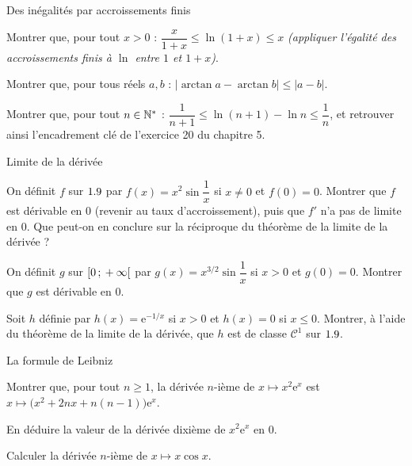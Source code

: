 \begin{exercice}[2]{Des inégalités par accroissements finis}
\begin{questions}
  \item Montrer que, pour tout $x>0$ :
    $\dfrac{x}{1+x}\leq\ln(1+x)\leq x$
    \emph{(appliquer l'égalité des accroissements finis à $\ln$ entre $1$
    et $1+x$)}.
  \item Montrer que, pour tous réels $a,b$ :
    $|\arctan a-\arctan b|\leq|a-b|$.
  \item Montrer que, pour tout $n\in\mathbb{N}^{*}$ :
    $\dfrac{1}{n+1}\leq\ln(n+1)-\ln n\leq\dfrac1n$, et retrouver ainsi
    l'encadrement clé de l'exercice 20 du chapitre 5.
\end{questions}
\end{exercice}

\begin{exercice}[2]{Limite de la dérivée}
\begin{questions}
  \item On définit $f$ sur $1.9$ par $f(x)=x^{2}\sin\dfrac1x$ si $x\neq0$ et
    $f(0)=0$. Montrer que $f$ est dérivable en $0$ (revenir au taux
    d'accroissement), puis que $f'$ n'a pas de limite en $0$. Que peut-on
    en conclure sur la réciproque du théorème de la limite de la dérivée ?
  \item On définit $g$ sur $\mathopen{[}0\,{;}\,+\infty\mathclose{[}$ par
    $g(x)=x^{3/2}\sin\dfrac1x$ si $x>0$ et $g(0)=0$. Montrer que $g$ est
    dérivable en $0$.
  \item Soit $h$ définie par $h(x)=\mathrm{e}^{-1/x}$ si $x>0$ et $h(x)=0$ si
    $x\leq0$. Montrer, à l'aide du théorème de la limite de la dérivée, que
    $h$ est de classe $\mathscr{C}^{1}$ sur $1.9$.
\end{questions}
\end{exercice}

\begin{exercice}[2]{La formule de Leibniz}
\begin{questions}
  \item Montrer que, pour tout $n\geq1$, la dérivée $n$-ième de
    $x\mapsto x^{2}\mathrm{e}^{x}$ est
    $x\mapsto\bigl(x^{2}+2nx+n(n-1)\bigr)\mathrm{e}^{x}$.
  \item En déduire la valeur de la dérivée dixième de $x^{2}\mathrm{e}^{x}$
    en $0$.
  \item Calculer la dérivée $n$-ième de $x\mapsto x\cos x$.
\end{questions}
\end{exercice}

